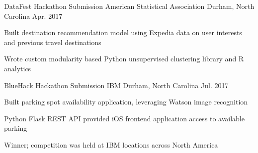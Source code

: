 \begin{cventries}


\cventry
	{DataFest Hackathon Submission} %
	{American Statistical Association} %
	{Durham, North Carolina} %
	{Apr. 2017} %
	{
		\begin{cvitems} %
			\item {Built destination recommendation model using Expedia data on user interests and previous travel destinations}
			\item {Wrote custom modularity based Python unsupervised clustering library and R analytics}
		\end{cvitems}
	}

\cventry
{BlueHack Hackathon Submission} %
{IBM} %
{Durham, North Carolina} %
{Jul. 2017} %
{
	\begin{cvitems} %
		\item {Built parking spot availability application, leveraging Watson image recognition}
		\item {Python Flask REST API provided iOS frontend application access to available parking}
		\item {Winner; competition was held at IBM locations across North America}
	\end{cvitems}
}




\end{cventries}